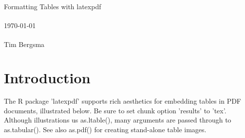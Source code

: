 \documentclass[titlepage]{article}
\begin{document}

\vspace*{2cm}
\begin{center}
\vspace{1.5cm}
{\Large Formatting Tables with latexpdf}\\
~\\
\today\\
~\\
Tim Bergsma\\
\end{center}
\newpage

\section*{Introduction}

The R package 'latexpdf' supports rich aesthetics for embedding tables in PDF documents, illustrated below.  Be sure to set chunk option 'results' to 'tex'.  Although illustrations us as.ltable(), many arguments are passed through to as.tabular().  See also as.pdf() for creating stand-alone table images.
\end{document}
